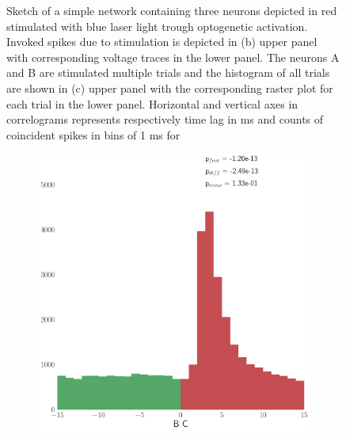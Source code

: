 \documentclass[11pt]{article}
\begin{document}
\begin{figure}
\begin{subfigure}{0.485\textwidth}
\caption{} \label{fig:intro:4}
\end{subfigure}
\caption{Sketch of a simple network containing three neurons depicted in red stimulated with blue laser light trough optogenetic activation. Invoked spikes due to stimulation is depicted in (b) upper panel with corresponding voltage traces in the lower panel. The neurons A and B are stimulated multiple trials and the  histogram of all trials are shown in (c) upper panel with the corresponding raster plot for each trial in the lower panel. Horizontal and vertical axes in correlograms represents respectively time lag in ms and counts of coincident spikes in bins of 1 ms for  \label{fig:intro}}
\end{figure}

\begin{figure}
\begin{subfigure}{0.485\textwidth} \includegraphics[scale=.25]{xcorr_highres_BC}
\caption{} \label{fig:cchvswald:1}
\end{subfigure}\hfill

\end{figure}
\end{document}
